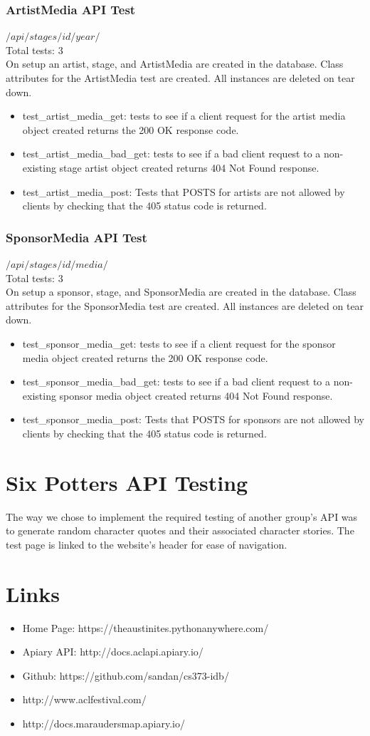 \documentclass[12pt,english]{scrartcl}
\begin{document}
\subsubsection{ArtistMedia API Test}
$/api/stages/{id}/{year}/$ \\
Total tests: 3 \\
On setup an artist, stage, and ArtistMedia are created in the database. Class attributes for the ArtistMedia test are created.
All instances are deleted on tear down.
\begin{itemize}
\item test\_artist\_media\_get: tests to see if a client request for the artist media object created returns the 200 OK response code.
\item test\_artist\_media\_bad\_get: tests to see if a bad client request to a non-existing stage artist object created returns
404 Not Found response.
\item test\_artist\_media\_post: Tests that POSTS for artists are not allowed by clients by checking that the 405 status code is returned.
\end{itemize}

\subsubsection{SponsorMedia API Test}
$/api/stages/{id}/{media}/$ \\
Total tests: 3 \\
On setup a sponsor, stage, and SponsorMedia are created in the database. Class attributes for the SponsorMedia test are created.
All instances are deleted on tear down.
\begin{itemize}
\item test\_sponsor\_media\_get: tests to see if a client request for the sponsor media object created returns the 200 OK response code.
\item test\_sponsor\_media\_bad\_get: tests to see if a bad client request to a non-existing sponsor media object created returns
404 Not Found response.
\item test\_sponsor\_media\_post: Tests that POSTS for sponsors are not allowed by clients by checking that the 405 status code is returned.
\end{itemize}


\section{Six Potters API Testing}
The way we chose to implement the required testing of another group's API was to generate random character quotes and 
their associated character stories. The test page is linked to the website's header for ease of navigation.

\section{Links}

\begin{itemize}
 \item Home Page: https://theaustinites.pythonanywhere.com/
 \item Apiary API: http://docs.aclapi.apiary.io/
 \item Github: https://github.com/sandan/cs373-idb/
 \item http://www.aclfestival.com/
 \item http://docs.maraudersmap.apiary.io/
\end{itemize}
\end{document}
